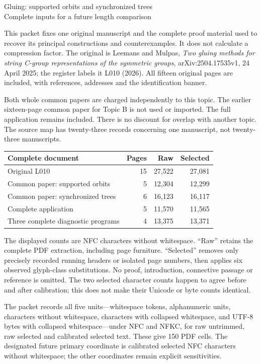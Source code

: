 \documentclass[11pt,a4paper]{article}
\begin{document}
\begin{center}{\Large Gluing: supported orbits and synchronized trees}\\[4pt]
Complete inputs for a future length comparison\end{center}

This packet fixes one original manuscript and the complete proof material used to recover its principal constructions and counterexamples. It does not calculate a compression factor. The original is Leemans and Mulpas, \emph{Two gluing methods for string C-group representations of the symmetric groups}, arXiv:2504.17535v1, 24 April 2025; the register labels it L010 (2026). All fifteen original pages are included, with references, addresses and the identification banner.

Both whole common papers are charged independently to this topic. The earlier sixteen-page common paper for Topic B is not used or imported. The full application remains included. There is no discount for overlap with another topic. The source map has twenty-three records concerning one manuscript, not twenty-three manuscripts.

\begin{center}\small
\begin{tabular}{lrrr}\toprule
Complete document & Pages & Raw & Selected\\\midrule
Original L010 & 15 & 27,522 & 27,081 \\
Common paper: supported orbits & 5 & 12,304 & 12,299 \\
Common paper: synchronized trees & 6 & 16,123 & 16,117 \\
Complete application & 5 & 11,570 & 11,565 \\
Three complete diagnostic programs & 4 & 13,375 & 13,371 \\
\bottomrule\end{tabular}\end{center}

The displayed counts are NFC characters without whitespace. ``Raw'' retains the complete PDF extraction, including page furniture. ``Selected'' removes only precisely recorded running headers or isolated page numbers, then applies six observed glyph-class substitutions. No proof, introduction, connective passage or reference is omitted. The two selected character counts happen to agree before and after calibration; this does not make their Unicode or byte counts identical.

The packet records all five units---whitespace tokens, alphanumeric units, characters without whitespace, characters with collapsed whitespace, and UTF-8 bytes with collapsed whitespace---under NFC and NFKC, for raw untrimmed, raw selected and calibrated selected text. These give 150 PDF cells. The designated future primary coordinate is calibrated selected NFC characters without whitespace; the other coordinates remain explicit sensitivities.
\end{document}

